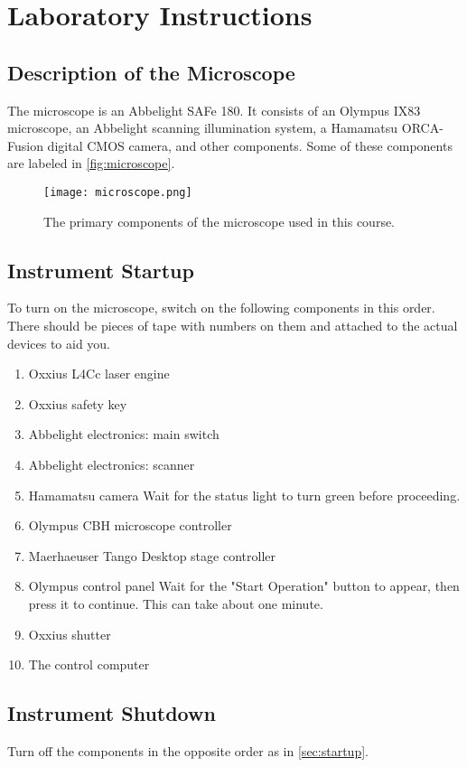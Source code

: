 \documentclass[10pt,a4paper,oneside]{book}
\begin{document}
\chapter{Laboratory Instructions}

\section{Description of the Microscope}

The microscope is an Abbelight SAFe 180. It consists of an Olympus IX83 microscope, an Abbelight scanning illumination system, a Hamamatsu ORCA-Fusion digital CMOS camera, and other components. Some of these components are labeled in \autoref{fig:microscope}.

\begin{figure}[ht]
    \centering
    \texttt{[image: microscope.png]}
    \caption{The primary components of the microscope used in this course.}
    \label{fig:microscope}
\end{figure}

\section{Instrument Startup}\label{sec:startup}

To turn on the microscope, switch on the following components in this order. There should be pieces of tape with numbers on them and attached to the actual devices to aid you.

\begin{enumerate}
    \item Oxxius L4Cc laser engine
    \item Oxxius safety key
    \item Abbelight electronics: main switch
    \item Abbelight electronics: scanner
    \item Hamamatsu camera \newline Wait for the status light to turn green before proceeding.
    \item Olympus CBH microscope controller
    \item Maerhaeuser Tango Desktop stage controller
    \item Olympus control panel \newline Wait for the "Start Operation" button to appear, then press it to continue. This can take about one minute.
    \item Oxxius shutter
    \item The control computer
\end{enumerate}

\section{Instrument Shutdown}

Turn off the components in the opposite order as in \autoref{sec:startup}.
\end{document}
